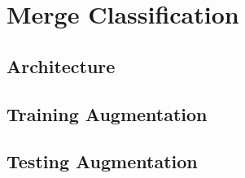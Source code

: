 \section{Merge Classification}

\subsection{Architecture}

\subsection{Training Augmentation}

\subsection{Testing Augmentation}